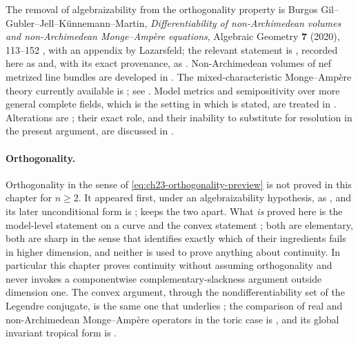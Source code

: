 The removal of algebraizability from the orthogonality property is
Burgos Gil--Gubler--Jell--K\"unnemann--Martin, \emph{Differentiability of
non-Archimedean volumes and non-Archimedean Monge--Amp\`ere equations},
Algebraic Geometry \textbf{7} (2020), 113--152 \cite{BGGJKM20}, with an
appendix by Lazarsfeld; the relevant statement is
\cite[Theorem~6.3.3]{BGGJKM20}, recorded here as
 and, with its exact provenance,
as .  Non-Archimedean volumes of nef
metrized line bundles are developed in \cite{BGM21}.  The
mixed-characteristic Monge--Amp\`ere theory currently available is
\cite{FGK25}; see .  Model metrics and
semipositivity over more general complete fields, which is the setting in
which  is stated, are treated in
\cite{GM19}.  Alterations are \cite{deJong1996}; their exact role, and their
inability to substitute for resolution in the present argument, are
discussed in .

\paragraph{Orthogonality.}
Orthogonality in the sense of
\eqref{eq:ch23-orthogonality-preview} is not proved in this chapter for
\(n\geq2\).  It appeared first, under an algebraizability hypothesis, as
\cite[Theorem~A.4]{BFJ15}, and its later unconditional form is
\cite{BGGJKM20};  keeps the two apart.
What \emph{is} proved here is the model-level statement
 on a curve and the convex
statement ; both are
elementary, both are sharp in the sense that
 identifies exactly which of their
ingredients fails in higher dimension, and neither is used to prove
anything about continuity.  In particular this chapter proves continuity
without assuming orthogonality and never invokes a componentwise
complementary-slackness argument outside dimension one.  The convex
argument, through the nondifferentiability set of the Legendre conjugate, is
the same one that underlies ; the
comparison of real and non-Archimedean Monge--Amp\`ere operators in the
toric case is \cite{Vil20}, and its global invariant tropical form is
\cite{BGJKK25}.

